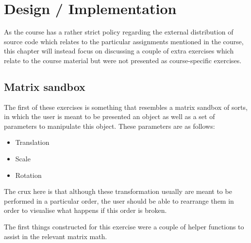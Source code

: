 \section{Design / Implementation}
\label{ch:impl}
\noindent	

As the course has a rather strict policy regarding the external distribution of source code which relates to the particular assignments mentioned in the course, this chapter will instead focus on discussing a couple of extra exercises which relate to the course material but were not presented as course-specific exercises.

\subsection{Matrix sandbox}

The first of these exercises is something that resembles a matrix sandbox of sorts, in which the user is meant to be presented an object as well as a set of parameters to manipulate this object. These parameters are as follows:

\begin{itemize}
	\item Translation
	\item Scale
	\item Rotation
\end{itemize}

The crux here is that although these transformation usually are meant to be performed in a particular order, the user should be able to rearrange them in order to visualise what happens if this order is broken.

The first things constructed for this exercise were a couple of helper functions to assist in the relevant matrix math.

